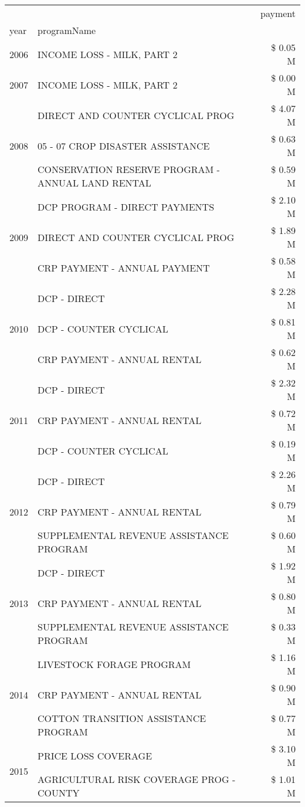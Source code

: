 \begin{tabular}{llr}
\toprule
 &  & payment \\
year & programName &  \\
\midrule
2006 & INCOME LOSS - MILK, PART 2 & \$ 0.05 M \\
\cline{1-3}
2007 & INCOME LOSS - MILK, PART 2 & \$ 0.00 M \\
\cline{1-3}
\multirow[t]{3}{*}{2008} & DIRECT AND COUNTER CYCLICAL PROG & \$ 4.07 M \\
 & 05 - 07 CROP DISASTER ASSISTANCE & \$ 0.63 M \\
 & CONSERVATION RESERVE PROGRAM - ANNUAL LAND RENTAL & \$ 0.59 M \\
\cline{1-3}
\multirow[t]{3}{*}{2009} & DCP PROGRAM - DIRECT PAYMENTS & \$ 2.10 M \\
 & DIRECT AND COUNTER CYCLICAL PROG & \$ 1.89 M \\
 & CRP PAYMENT - ANNUAL PAYMENT & \$ 0.58 M \\
\cline{1-3}
\multirow[t]{3}{*}{2010} & DCP - DIRECT & \$ 2.28 M \\
 & DCP - COUNTER CYCLICAL & \$ 0.81 M \\
 & CRP PAYMENT - ANNUAL RENTAL & \$ 0.62 M \\
\cline{1-3}
\multirow[t]{3}{*}{2011} & DCP - DIRECT & \$ 2.32 M \\
 & CRP PAYMENT - ANNUAL RENTAL & \$ 0.72 M \\
 & DCP - COUNTER CYCLICAL & \$ 0.19 M \\
\cline{1-3}
\multirow[t]{3}{*}{2012} & DCP - DIRECT & \$ 2.26 M \\
 & CRP PAYMENT - ANNUAL RENTAL & \$ 0.79 M \\
 & SUPPLEMENTAL REVENUE ASSISTANCE PROGRAM & \$ 0.60 M \\
\cline{1-3}
\multirow[t]{3}{*}{2013} & DCP - DIRECT & \$ 1.92 M \\
 & CRP PAYMENT - ANNUAL RENTAL & \$ 0.80 M \\
 & SUPPLEMENTAL REVENUE ASSISTANCE PROGRAM & \$ 0.33 M \\
\cline{1-3}
\multirow[t]{3}{*}{2014} & LIVESTOCK FORAGE PROGRAM & \$ 1.16 M \\
 & CRP PAYMENT - ANNUAL RENTAL & \$ 0.90 M \\
 & COTTON TRANSITION ASSISTANCE PROGRAM & \$ 0.77 M \\
\cline{1-3}
\multirow[t]{3}{*}{2015} & PRICE LOSS COVERAGE & \$ 3.10 M \\
 & AGRICULTURAL RISK COVERAGE PROG - COUNTY & \$ 1.01 M \\

\end{tabular}
